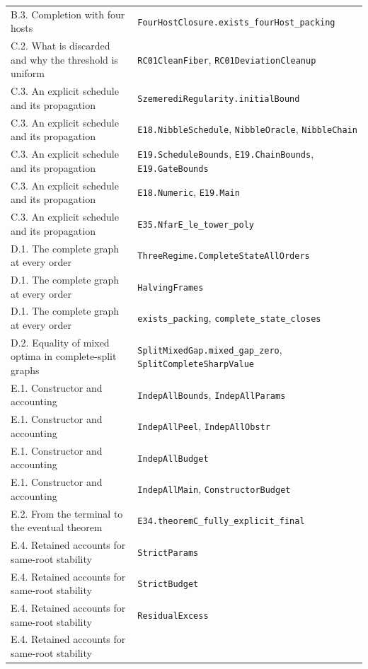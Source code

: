 \documentclass[english,11pt,a4paper]{article}
\begin{document}
{\begin{longtable}[]{@{}
  >{\raggedright\arraybackslash}p{}
  >{\raggedright\arraybackslash}p{}@{}}
B.3. Completion with four hosts &
\nolinkurl{FourHostClosure.exists_fourHost_packing} \\
C.2. What is discarded and why the threshold is uniform &
\nolinkurl{RC01CleanFiber}, \nolinkurl{RC01DeviationCleanup} \\
C.3. An explicit schedule and its propagation &
\nolinkurl{SzemerediRegularity.initialBound} \\
C.3. An explicit schedule and its propagation &
\nolinkurl{E18.NibbleSchedule}, \nolinkurl{NibbleOracle},
\nolinkurl{NibbleChain} \\
C.3. An explicit schedule and its propagation &
\nolinkurl{E19.ScheduleBounds}, \nolinkurl{E19.ChainBounds},
\nolinkurl{E19.GateBounds} \\
C.3. An explicit schedule and its propagation & \nolinkurl{E18.Numeric},
\nolinkurl{E19.Main} \\
C.3. An explicit schedule and its propagation &
\nolinkurl{E35.NfarE_le_tower_poly} \\
D.1. The complete graph at every order &
\nolinkurl{ThreeRegime.CompleteStateAllOrders} \\
D.1. The complete graph at every order & \nolinkurl{HalvingFrames} \\
D.1. The complete graph at every order & \nolinkurl{exists_packing},
\nolinkurl{complete_state_closes} \\
D.2. Equality of mixed optima in complete-split graphs &
\nolinkurl{SplitMixedGap.mixed_gap_zero},
\nolinkurl{SplitCompleteSharpValue} \\
E.1. Constructor and accounting & \nolinkurl{IndepAllBounds},
\nolinkurl{IndepAllParams} \\
E.1. Constructor and accounting & \nolinkurl{IndepAllPeel},
\nolinkurl{IndepAllObstr} \\
E.1. Constructor and accounting & \nolinkurl{IndepAllBudget} \\
E.1. Constructor and accounting & \nolinkurl{IndepAllMain},
\nolinkurl{ConstructorBudget} \\
E.2. From the terminal to the eventual theorem &
\nolinkurl{E34.theoremC_fully_explicit_final} \\
E.4. Retained accounts for same-root stability &
\nolinkurl{StrictParams} \\
E.4. Retained accounts for same-root stability &
\nolinkurl{StrictBudget} \\
E.4. Retained accounts for same-root stability &
\nolinkurl{ResidualExcess} \\
E.4. Retained accounts for same-root stability &

\end{longtable}}
\end{document}
